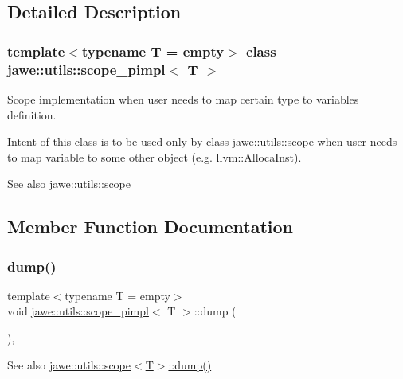 \subsection{Detailed Description}
\subsubsection*{template$<$typename T = empty$>$\newline
class jawe\+::utils\+::scope\+\_\+pimpl$<$ T $>$}

Scope implementation when user needs to map certain type to variable\textquotesingle{}s definition. 

Intent of this class is to be used only by class \hyperlink{classjawe_1_1utils_1_1scope}{jawe\+::utils\+::scope} when user needs to map variable to some other object (e.\+g. llvm\+::\+Alloca\+Inst).

\begin{DoxySeeAlso}{See also}
\hyperlink{classjawe_1_1utils_1_1scope}{jawe\+::utils\+::scope} 
\end{DoxySeeAlso}


\subsection{Member Function Documentation}
\mbox{\label{classjawe_1_1utils_1_1scope__pimpl_a0122f51a341a4bb251bbc8b0178c3a7e}} 
\subsubsection{\texorpdfstring{dump()}{dump()}}
{\footnotesize\ttfamily template$<$typename T = empty$>$ \\
void \hyperlink{classjawe_1_1utils_1_1scope__pimpl}{jawe\+::utils\+::scope\+\_\+pimpl}$<$ T $>$\+::dump (\begin{DoxyParamCaption}{ }\end{DoxyParamCaption})\hspace{0.3cm}{\ttfamily [inline]}, {\ttfamily [private]}}

\begin{DoxySeeAlso}{See also}
\hyperlink{classjawe_1_1utils_1_1scope_a97240fdcdf9b05029449ba0f652c3417}{jawe\+::utils\+::scope$<$\+T$>$\+::dump()} 
\end{DoxySeeAlso}
\mbox{\label{classjawe_1_1utils_1_1scope__pimpl_ae35dce5405fb77cc36b0060fed59086c}} 
